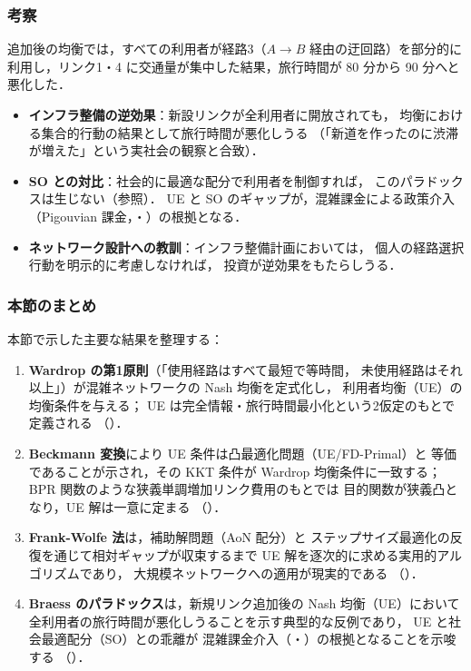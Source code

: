 \subsubsection*{考察}

追加後の均衡では，すべての利用者が経路3（$A \to B$ 経由の迂回路）を部分的に
利用し，リンク1・4 に交通量が集中した結果，旅行時間が 80 分から 90 分へと
悪化した．

\begin{itemize}
  \item \textbf{インフラ整備の逆効果}：新設リンクが全利用者に開放されても，
        均衡における集合的行動の結果として旅行時間が悪化しうる
        （「新道を作ったのに渋滞が増えた」という実社会の観察と合致）．
  \item \textbf{SO との対比}：社会的に最適な配分で利用者を制御すれば，
        このパラドックスは生じない（参照）．
        UE と SO のギャップが，混雑課金による政策介入
        （Pigouvian 課金，・\cite{Pigou1920}）の根拠となる．
  \item \textbf{ネットワーク設計への教訓}：インフラ整備計画においては，
        個人の経路選択行動を明示的に考慮しなければ，
        投資が逆効果をもたらしうる．
\end{itemize}

\subsubsection*{本節のまとめ}

本節で示した主要な結果を整理する：
\begin{enumerate}
  \item \textbf{Wardrop の第1原則}（「使用経路はすべて最短で等時間，
        未使用経路はそれ以上」）が混雑ネットワークの Nash 均衡を定式化し，
        利用者均衡（UE）の均衡条件を与える；
        UE は完全情報・旅行時間最小化という2仮定のもとで定義される
        （）．
  \item \textbf{Beckmann 変換}により UE 条件は凸最適化問題（UE/FD-Primal）と
        等価であることが示され，その KKT 条件が Wardrop 均衡条件に一致する；
        BPR 関数のような狭義単調増加リンク費用のもとでは
        目的関数が狭義凸となり，UE 解は一意に定まる
        （）．
  \item \textbf{Frank-Wolfe 法}は，補助解問題（AoN 配分）と
        ステップサイズ最適化の反復を通じて相対ギャップが収束するまで
        UE 解を逐次的に求める実用的アルゴリズムであり，
        大規模ネットワークへの適用が現実的である
        （）．
  \item \textbf{Braess のパラドックス}は，新規リンク追加後の Nash 均衡（UE）において
        全利用者の旅行時間が悪化しうることを示す典型的な反例であり，
        UE と社会最適配分（SO）との乖離が
        混雑課金介入（・）の根拠となることを示唆する
        （）．
\end{enumerate}

